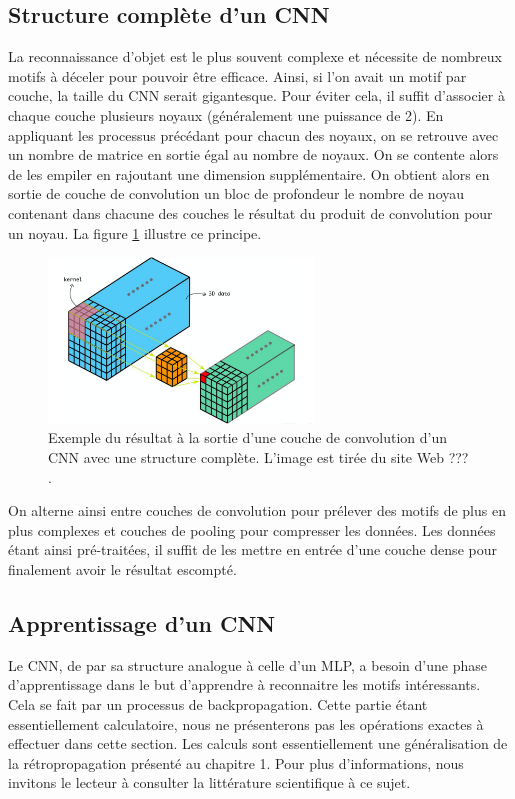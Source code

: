 \subsection{Structure complète d'un CNN}

La reconnaissance d'objet est le plus souvent complexe et nécessite de nombreux motifs à déceler pour pouvoir être efficace. Ainsi, si l'on avait un motif par couche, la taille du CNN serait gigantesque. Pour éviter cela, il suffit d'associer à chaque couche plusieurs noyaux (généralement une puissance de 2). En appliquant les processus précédant pour chacun des noyaux, on se retrouve avec un nombre de matrice en sortie égal au nombre de noyaux. On se contente alors de les empiler en rajoutant une dimension supplémentaire. On obtient alors en sortie de couche de convolution un bloc de profondeur le nombre de noyau contenant dans chacune des couches  le résultat du produit de convolution pour un noyau. La figure \ref{structure_CNN_2} illustre ce principe.

\begin{figure}[!h]
\centering
\includegraphics[width=200pt]{images/cnn/structure_CNN_2.png}
\caption{Exemple du résultat à la sortie d'une couche de convolution d'un CNN avec une structure complète. L'image est tirée du site Web ??? \cite{3D_convolution}.}
\label{structure_CNN_2}
\end{figure}

On alterne ainsi entre couches de convolution pour prélever des motifs de plus en plus complexes et couches de pooling pour compresser les données. Les données étant ainsi pré-traitées, il suffit de les mettre en entrée d'une couche dense pour finalement avoir le résultat escompté.

\subsection{Apprentissage d'un CNN}

Le CNN, de par sa structure analogue à celle d'un MLP, a besoin d'une phase d'apprentissage dans le but d'apprendre à reconnaitre les motifs intéressants. Cela se fait par un processus de backpropagation. Cette partie étant essentiellement calculatoire, nous ne présenterons pas les opérations exactes à effectuer dans cette section. Les calculs sont essentiellement une généralisation de la rétropropagation présenté au chapitre 1. Pour plus d'informations, nous invitons le lecteur à consulter la littérature scientifique à ce sujet.
 
